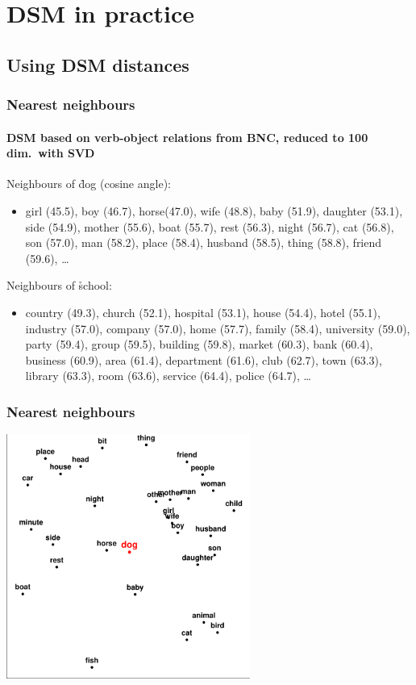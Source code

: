 \documentclass[t]{beamer} %
\begin{document}
\section{DSM in practice}

\subsection{Using DSM distances}

\begin{frame}
  \frametitle{Nearest neighbours}
  \framesubtitle{DSM based on verb-object relations from BNC, reduced to 100 dim.\ with SVD}

  Neighbours of \h{dog} (cosine angle):
  \begin{itemize}\item[\hand]
    girl (45.5), boy (46.7), horse(47.0), wife (48.8), baby (51.9),
    daughter (53.1), side (54.9), mother (55.6), boat (55.7),
    rest (56.3), night (56.7), cat (56.8), son (57.0), man (58.2), 
    place (58.4), husband (58.5), thing (58.8), friend (59.6), \ldots
  \end{itemize}

  \gap
  Neighbours of \h{school}:
  \begin{itemize}\item[\hand]
    country (49.3), church (52.1), hospital (53.1), house (54.4),
    hotel (55.1), industry (57.0), company (57.0), home (57.7), family
    (58.4), university (59.0), party (59.4), group (59.5), building
    (59.8), market (60.3), bank (60.4), business (60.9), area (61.4),
    department (61.6), club (62.7), town (63.3), library (63.3), 
    room (63.6), service (64.4), police (64.7), \ldots
  \end{itemize}
\end{frame}

\begin{frame}[c]
  \frametitle{Nearest neighbours}

  \ungap[1]
  \begin{center}
    \includegraphics[width=8cm]{img/neighbourhood_dog}
  \end{center}
\end{frame}
\end{document}

